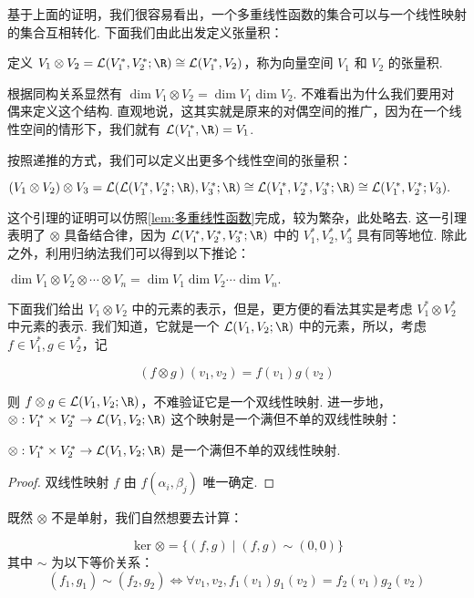 基于上面的证明，我们很容易看出，一个多重线性函数的集合可以与一个线性映射的集合互相转化. 下面我们由此出发定义张量积：

\begin{definition}{}{}
    定义 $V_1 \otimes V_2 = \mathcal{L}(V_1^*, V_2^*; \R) \cong \mathcal{L}(V_1^*, V_2)$，称为向量空间 $V_1$ 和 $V_2$ 的张量积.
\end{definition}

根据同构关系显然有 $\dim V_1 \otimes V_2 = \dim V_1 \dim V_2$. 不难看出为什么我们要用对偶来定义这个结构. 直观地说，这其实就是原来的对偶空间的推广，因为在一个线性空间的情形下，我们就有 $\mathcal{L}(V_1^*, \R) = V_1$.

按照递推的方式，我们可以定义出更多个线性空间的张量积：
\begin{lemma}{}{}
    $(V_1 \otimes V_2) \otimes V_3 = \mathcal{L}(\mathcal{L}(V_1^*, V_2^*; \R), V_3^*; \R) \cong \mathcal{L}(V_1^*, V_2^*, V_3^*; \R) \cong \mathcal{L}(V_1^*, V_2^*; V_3).$
\end{lemma}

这个引理的证明可以仿照\autoref{lem:多重线性函数}完成，较为繁杂，此处略去. 这一引理表明了 $\otimes$ 具备结合律，因为 $\mathcal{L}(V_1^*, V_2^*, V_3^*; \R)$ 中的 $V_1^*, V_2^*, V_3^*$ 具有同等地位. 除此之外，利用归纳法我们可以得到以下推论：
\begin{corollary}{}{}
    $\dim V_1 \otimes V_2 \otimes \cdots \otimes V_n = \dim V_1 \dim V_2 \cdots \dim V_n.$
\end{corollary}

下面我们给出 $V_1 \otimes V_2$ 中的元素的表示，但是，更方便的看法其实是考虑 $V_1^* \otimes V_2^*$ 中元素的表示. 我们知道，它就是一个 $\mathcal{L}(V_1, V_2; \R)$ 中的元素，所以，考虑 $f \in V_1^*, g \in V_2^*$，记

\[
(f \otimes g) (v_1, v_2) = f(v_1) g(v_2)
\]

则 $f \otimes g \in \mathcal{L}(V_1, V_2; \R)$，不难验证它是一个双线性映射. 进一步地，$\otimes: V_1^* \times V_2^* \to \mathcal{L}(V_1, V_2; \R)$ 这个映射是一个满但不单的双线性映射：
\begin{lemma}{}{}
    $\otimes: V_1^* \times V_2^* \to \mathcal{L}(V_1, V_2; \R)$ 是一个满但不单的双线性映射.
\end{lemma}
\begin{proof}
    双线性映射 $f$ 由 $f(\alpha_i,\beta_j)$ 唯一确定.
\end{proof}

既然 $\otimes$ 不是单射，我们自然想要去计算：

\begin{lemma}{}{}
    \[
    \ker \otimes = \{(f, g) \mid (f, g) \sim (0, 0)\}
    \]
    其中 $\sim$ 为以下等价关系：
    \[
    (f_1, g_1) \sim (f_2, g_2) \iff \forall v_1, v_2, f_1(v_1) g_1(v_2) = f_2(v_1) g_2(v_2)
    \]
\end{lemma}

